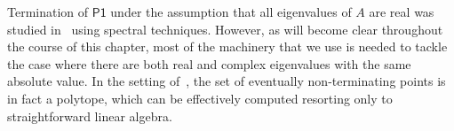

Termination of $\mathsf{P1}$ under the assumption that all eigenvalues
of $A$ are real was studied in~\cite{RMM,RMM1} using spectral
techniques. However, as will become clear throughout the course of
this chapter, most of the machinery that we use is needed to tackle the
case where there are both real and complex eigenvalues with the same
absolute value. In the setting of~\cite{RMM,RMM1}, the set of
eventually non-terminating points is in fact a polytope, which can be
effectively computed resorting only to straightforward linear algebra.

